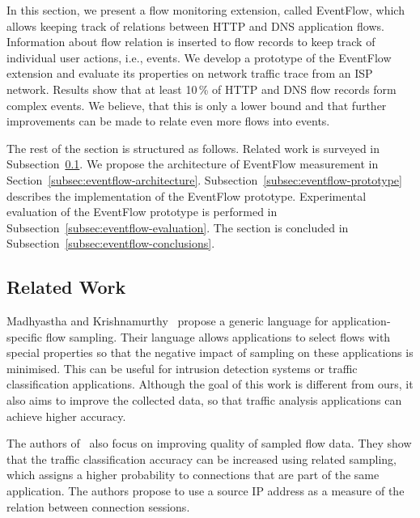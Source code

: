 In this section, we present a flow monitoring extension, called EventFlow, which allows keeping track of relations between HTTP and DNS application flows. Information about flow relation is inserted to flow records to keep track of individual user actions, i.e., events. We develop a prototype of the EventFlow extension and evaluate its properties on network traffic trace from an ISP network. Results show that at least 10\,\% of HTTP and DNS flow records form complex events. We believe, that this is only a lower bound and that further improvements can be made to relate even more flows into events.

The rest of the section is structured as follows. Related work is surveyed in Subsection~\ref{subsec:eventflow-related_work}. We propose the architecture of EventFlow measurement in Section~\ref{subsec:eventflow-architecture}. Subsection~\ref{subsec:eventflow-prototype} describes the implementation of the EventFlow prototype. Experimental evaluation of the EventFlow prototype is performed in Subsection~\ref{subsec:eventflow-evaluation}. The section is concluded in Subsection~\ref{subsec:eventflow-conclusions}.


\subsection{Related Work} \label{subsec:eventflow-related_work}

Madhyastha and Krishnamurthy~\cite{Madhyastha-2008-Generic} propose a generic language for application-specific flow sampling. Their language allows applications to select flows with special properties so that the negative impact of sampling on these applications is minimised. This can be useful for intrusion detection systems or traffic classification applications. Although the goal of this work is different from ours, it also aims to improve the collected data, so that traffic analysis applications can achieve higher accuracy.

The authors of~\cite{Lee-2015-Flow} also focus on improving quality of sampled flow data. They show that the traffic classification accuracy can be increased using related sampling, which assigns a higher probability to connections that are part of the same application. The authors propose to use a source IP address as a measure of the relation between connection sessions.

